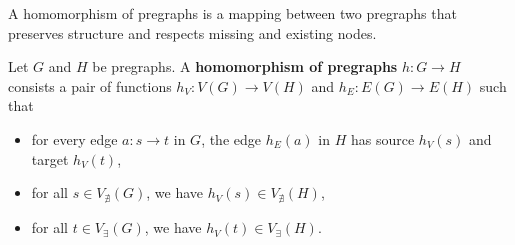  A homomorphism of pregraphs is a mapping between two pregraphs that preserves structure and respects missing and existing nodes.
 \begin{definition} 
    \label{def:pregraph:homomorphism}
    Let \( G \) and \( H \) be pregraphs. A \textbf{homomorphism of pregraphs} $h: G \to H$ consists a pair of functions $h_V: V(G) \to V(H) $ and $h_E: E(G) \to E(H)$ such that
    \begin{itemize}
        \item for every edge \( a \colon s \to t \) in \( G \), the edge \( h_E(a) \) in $H$ has source \( h_V(s) \) and target \( h_V(t) \),
        \item for all $s \in V_{\nexists}(G)$, we have $h_V(s) \in V_{\nexists}(H)$,
        \item for all $t \in V_\exists(G)$, we have $h_V(t) \in V_\exists(H)$.
    \end{itemize} 
\end{definition}

